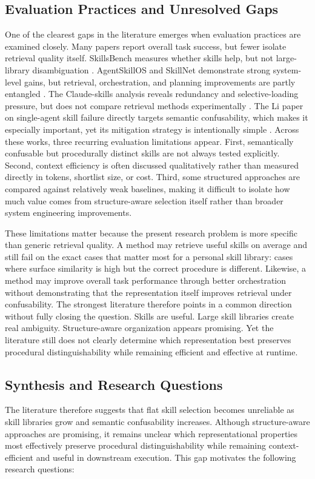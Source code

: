 \documentclass[a4paper]{article}
\begin{document}
\subsection{Evaluation Practices and Unresolved Gaps}
One of the clearest gaps in the literature emerges when evaluation practices are examined closely. Many papers report overall task success, but fewer isolate retrieval quality itself. SkillsBench measures whether skills help, but not large-library disambiguation \cite{li2026skillsbench}. AgentSkillOS and SkillNet demonstrate strong system-level gains, but retrieval, orchestration, and planning improvements are partly entangled \cite{li2026agentskillos, liang2026skillnet}. The Claude-skills analysis reveals redundancy and selective-loading pressure, but does not compare retrieval methods experimentally \cite{ling2026claudeskills}. The Li paper on single-agent skill failure directly targets semantic confusability, which makes it especially important, yet its mitigation strategy is intentionally simple \cite{li2026singleagent}. Across these works, three recurring evaluation limitations appear. First, semantically confusable but procedurally distinct skills are not always tested explicitly. Second, context efficiency is often discussed qualitatively rather than measured directly in tokens, shortlist size, or cost. Third, some structured approaches are compared against relatively weak baselines, making it difficult to isolate how much value comes from structure-aware selection itself rather than broader system engineering improvements.

These limitations matter because the present research problem is more specific than generic retrieval quality. A method may retrieve useful skills on average and still fail on the exact cases that matter most for a personal skill library: cases where surface similarity is high but the correct procedure is different. Likewise, a method may improve overall task performance through better orchestration without demonstrating that the representation itself improves retrieval under confusability. The strongest literature therefore points in a common direction without fully closing the question. Skills are useful. Large skill libraries create real ambiguity. Structure-aware organization appears promising. Yet the literature still does not clearly determine which representation best preserves procedural distinguishability while remaining efficient and effective at runtime.

\subsection{Synthesis and Research Questions}
The literature therefore suggests that flat skill selection becomes unreliable as skill libraries grow and semantic confusability increases. Although structure-aware approaches are promising, it remains unclear which representational properties most effectively preserve procedural distinguishability while remaining context-efficient and useful in downstream execution. This gap motivates the following research questions:
\end{document}
